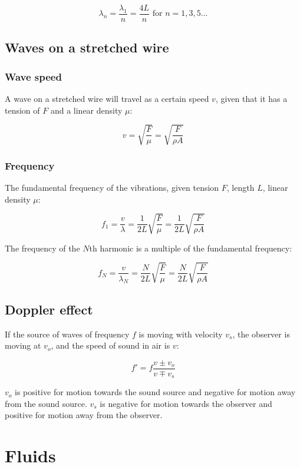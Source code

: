 \documentclass[12pt]{article}
\begin{document}
\[
\boxed{
\lambda_n = \frac{\lambda_1}{n} = \frac{4L}{n}\text{ for }n = 1,3,5...
}
\]

\subsection{Waves on a stretched wire}

\subsubsection{Wave speed}

A wave on a stretched wire will travel as a certain speed $v$, given that it has a tension of $F$ and a linear density $\mu$:

\[
\boxed{
v = \sqrt{\frac{F}{\mu}} = \sqrt{\frac{F}{\rho A}}
}
\]

\subsubsection{Frequency}

The fundamental frequency of the vibrations, given tension $F$, length $L$, linear density $\mu$:

\[
\boxed{
f_1 = \frac{v}{\lambda} = \frac{1}{2L} \sqrt{\frac{F}{\mu}} = \frac{1}{2L} \sqrt{\frac{F}{\rho A}}
}
\]

The frequency of the $N$th harmonic is a multiple of the fundamental frequency:

\[
\boxed{
f_N = \frac{v}{\lambda_N} = \frac{N}{2L} \sqrt{\frac{F}{\mu}} = \frac{N}{2L} \sqrt{\frac{F}{\rho A}}
}
\]

\subsection{Doppler effect}

If the source of waves of frequency $f$ is moving with velocity $v_s$, the observer is moving at $v_o$, and the speed of sound in air is $v$:

\[
\boxed{
f' = f \frac{v \pm v_o}{v \mp v_s}
}
\]

$v_o$ is positive for motion towards the sound source and negative for motion away from the sound source.
$v_s$ is negative for motion towards the observer and positive for motion away from the observer.

\newpage

\section{Fluids}
\end{document}

